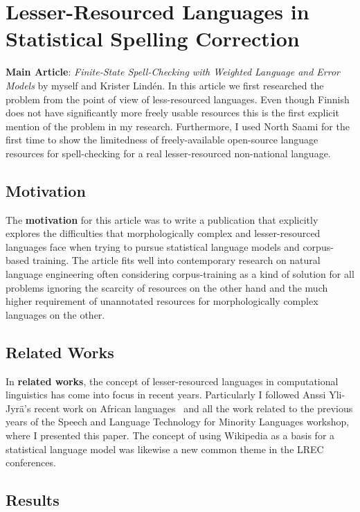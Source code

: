 \documentclass[officiallayout,final]{unihelcompling}
\begin{document}
\section{Lesser-Resourced Languages in Statistical Spelling Correction}
\label{sec:lesser-training}

\textbf{Main Article}: \emph{Finite-State Spell-Checking with Weighted Language
and Error Models} by myself and Krister Lindén. In this article we first
researched the problem from the point of view of less-resourced languages. Even
though Finnish does not have significantly more freely usable resources this is
the first explicit mention of the problem in my research. Furthermore, I used
North Saami for the first time to show the limitedness of freely-available
open-source language resources for spell-checking for a real lesser-resourced
non-national language.

\subsection{Motivation}

The \textbf{motivation} for this article was to write a publication that
explicitly explores the difficulties that morphologically complex and
lesser-resourced languages face when trying to pursue statistical language
models and corpus-based training. The article fits well into contemporary
research on natural language engineering often considering corpus-training as a
kind of solution for all problems ignoring the scarcity of resources on the
other hand and the much higher requirement of unannotated resources for
morphologically complex languages on the other.

\subsection{Related Works}

In \textbf{related works}, the concept of lesser-resourced languages in
computational linguistics has come into focus in recent years. Particularly I
followed Anssi Yli-Jyrä's recent work on African
languages~\citep{yli2005toward} and all the work related to the previous years
of the Speech and Language Technology for Minority Languages workshop, where I
presented this paper.  The concept of using Wikipedia as a basis for a
statistical language model was likewise a new common theme in the LREC
conferences.

\subsection{Results}
\end{document}

